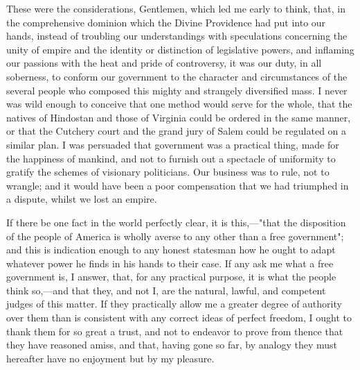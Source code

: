 These were the considerations, Gentlemen, which led me early to think, that, in the comprehensive dominion which the Divine Providence had put into our hands, instead of troubling our understandings with speculations concerning the unity of empire and the identity or distinction of legislative powers, and inflaming our passions with the heat and pride of controversy, it was our duty, in all soberness, to conform our government to the character and circumstances of the several people who composed this mighty and strangely diversified mass. I never was wild enough to conceive that one method would serve for the whole, that the natives of Hindostan and those of Virginia could be ordered in the same manner, or that the Cutchery court and the grand jury of Salem could be regulated on a similar plan. I was persuaded that government was a practical thing, made for the happiness of mankind, and not to furnish out a spectacle of uniformity to gratify the schemes of visionary politicians. Our business was to rule, not to wrangle; and it would have been a poor compensation that we had triumphed in a dispute, whilst we lost an empire.

If there be one fact in the world perfectly clear, it is this,—"that the disposition of the people of America is wholly averse to any other than a free government"; and this is indication enough to any honest statesman how he ought to adapt whatever power he finds in his hands to their case. If any ask me what a free government is, I answer, that, for any practical purpose, it is what the people think so,—and that they, and not I, are the natural, lawful, and competent judges of this matter. If they practically allow me a greater degree of authority over them than is consistent with any correct ideas of perfect freedom, I ought to thank them for so great a trust, and not to endeavor to prove from thence that they have reasoned amiss, and that, having gone so far, by analogy they must hereafter have no enjoyment but by my pleasure.

